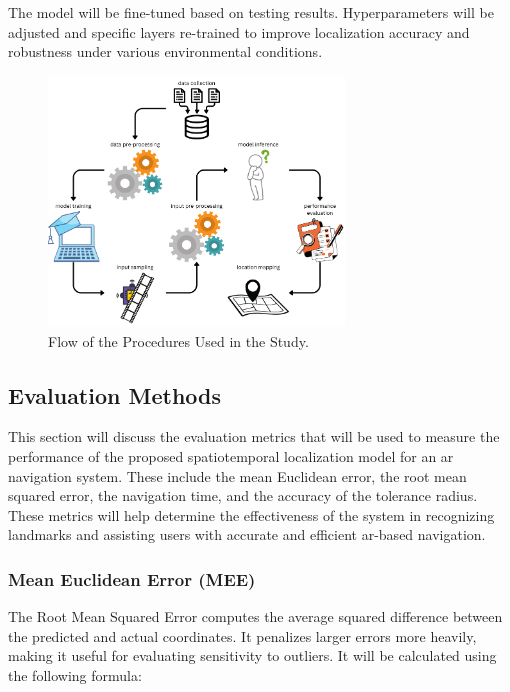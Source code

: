 \begin{refsection}
The model will be fine-tuned based on testing results. Hyperparameters will be adjusted and specific layers re-trained to improve localization accuracy and robustness under various environmental conditions.

\begin{figure}[H]
    \centering
	\includegraphics[width=0.7\textwidth]{figures/process.png} 
	\caption[Procedures in the Study]{Flow of the Procedures Used in the Study.}
	\label{fig:thirdFig}
\end{figure}

\subsection{Evaluation Methods}

This section will discuss the evaluation metrics that will be used to measure the performance of the proposed spatiotemporal localization model for an \gls{ar} navigation system. These include the mean Euclidean error, the root mean squared error, the navigation time, and the accuracy of the tolerance radius. These metrics will help determine the effectiveness of the system in recognizing landmarks and assisting users with accurate and efficient \gls{ar}-based navigation.

\subsubsection{Mean Euclidean Error (MEE)}

The Root Mean Squared Error computes the average squared difference between the predicted and actual coordinates. It penalizes larger errors more heavily, making it useful for evaluating sensitivity to outliers. It will be calculated using the following formula:


\end{refsection}
